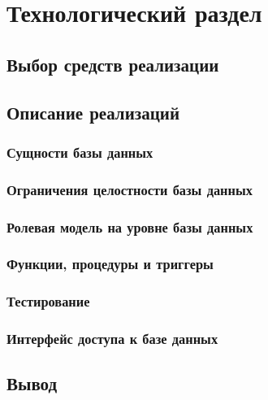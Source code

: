 \section{Технологический раздел}

\subsection{Выбор средств реализации}


\subsection{Описание реализаций}

\subsubsection{Сущности базы данных}

\subsubsection{Ограничения целостности базы данных}

\subsubsection{Ролевая модель на уровне базы данных}

\subsubsection{Функции, процедуры и триггеры}


\subsubsection{Тестирование}


\subsubsection{Интерфейс доступа к базе данных}

\subsection{Вывод}
